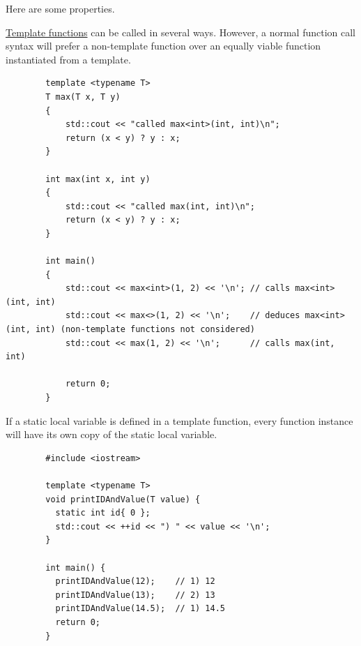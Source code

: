 \documentclass{article}
\begin{document}
    Here are some properties. 

    \begin{lemma}
      \label{thm:normal-function-call-priority}
      \hyperref[def:template-functions]{Template functions} can be called in several ways. However, a normal function call syntax will prefer a non-template function over an equally viable function instantiated from a template. 

      \begin{lstlisting}
        template <typename T>
        T max(T x, T y)
        {
            std::cout << "called max<int>(int, int)\n";
            return (x < y) ? y : x;
        }

        int max(int x, int y)
        {
            std::cout << "called max(int, int)\n";
            return (x < y) ? y : x;
        }

        int main()
        {
            std::cout << max<int>(1, 2) << '\n'; // calls max<int>(int, int)
            std::cout << max<>(1, 2) << '\n';    // deduces max<int>(int, int) (non-template functions not considered)
            std::cout << max(1, 2) << '\n';      // calls max(int, int)

            return 0;
        } 
      \end{lstlisting}
    \end{lemma} 

    \begin{lemma}
      \label{thm:static-local-variables}
      If a static local variable is defined in a template function, every function instance will have its own copy of the static local variable. 
      \begin{lstlisting}
        #include <iostream>

        template <typename T>
        void printIDAndValue(T value) {
          static int id{ 0 };
          std::cout << ++id << ") " << value << '\n';
        }

        int main() {
          printIDAndValue(12);    // 1) 12
          printIDAndValue(13);    // 2) 13 
          printIDAndValue(14.5);  // 1) 14.5
          return 0;
        } 
      \end{lstlisting}
    \end{lemma} 
\end{document}
